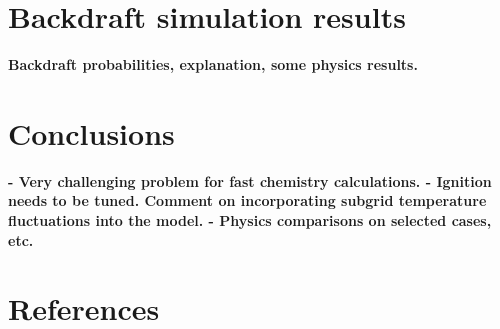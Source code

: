 \documentclass[12pt,letterpaper]{article}
\begin{document}
\begin{flushleft}
\section{Backdraft simulation results}




\textbf{Backdraft probabilities, explanation, some physics results.}


\section{Conclusions}

\textbf{- Very challenging problem for fast chemistry calculations. - Ignition needs to be tuned. Comment on incorporating subgrid temperature fluctuations into the model. - Physics comparisons on selected cases, etc.}

\section*{References}


	
%	
%	
%
%	
	
	
	
		
	

\end{flushleft}
\end{document}
